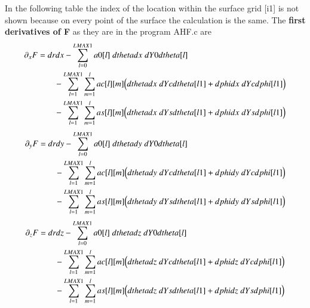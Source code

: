 \documentclass[11pt,a4paper,twoside]{article}
\begin{document}
In the following table the index of the location within the surface grid
[i1] is not shown because on every point of the surface the calculation
is the same. The \textbf{first derivatives of F} as they are in the 
program AHF.c are
\begin{align}
  \partial_x F &= drdx -\sum_{l=0}^{LMAX1} a0[l]\;dthetadx\; dY0dtheta[l]\notag\\
       &\qquad         -\sum_{l=1}^{LMAX1} \sum_{m=1}^{l}  ac[l][m] 
                           \Big( dthetadx\; dYcdtheta[l1] 
                                  +dphidx \;dYcdphi[l1] \Big)\notag\\
       &\qquad         -\sum_{l=1}^{LMAX1} \sum_{m=1}^{l}  as[l][m] 
                           \Big( dthetadx\; dYsdtheta[l1] 
                                  +dphidx\; dYsdphi[l1] \Big)
\end{align}
\begin{align}                           
  \partial_y F &= drdy -\sum_{l=0}^{LMAX1} a0[l]\;dthetady\; dY0dtheta[l]\notag\\
       &\qquad         -\sum_{l=1}^{LMAX1} \sum_{m=1}^{l}  ac[l][m] 
                           \Big( dthetady\; dYcdtheta[l1] 
                                  +dphidy \;dYcdphi[l1] \Big)\notag\\
       &\qquad         -\sum_{l=1}^{LMAX1} \sum_{m=1}^{l}  as[l][m] 
                           \Big( dthetady\; dYsdtheta[l1] 
                                  +dphidy\; dYsdphi[l1] \Big)
\end{align}
\begin{align}                                  
  \partial_z F &= drdz -\sum_{l=0}^{LMAX1} a0[l]\;dthetadz\; dY0dtheta[l]\notag\\
       &\qquad         -\sum_{l=1}^{LMAX1} \sum_{m=1}^{l}  ac[l][m] 
                           \Big( dthetadz\; dYcdtheta[l1] 
                                  +dphidz \;dYcdphi[l1] \Big)\notag\\
       &\qquad         -\sum_{l=1}^{LMAX1} \sum_{m=1}^{l}  as[l][m] 
                           \Big( dthetadz\; dYsdtheta[l1] 
                                  +dphidz\; dYsdphi[l1] \Big)
\end{align}
\end{document}
